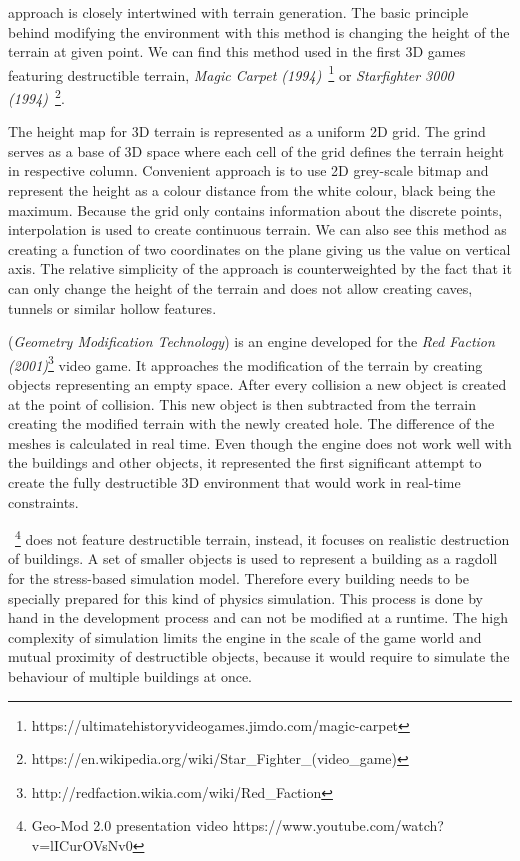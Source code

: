  approach is closely intertwined with terrain generation. The basic principle behind modifying the environment with this method is changing the height of the terrain at given point. We can find this method used in the first 3D games featuring destructible terrain, \eg \emph{Magic Carpet (1994)}~\footnote{https://ultimatehistoryvideogames.jimdo.com/magic-carpet} or \emph{Starfighter 3000 (1994)}~\footnote{https://en.wikipedia.org/wiki/Star\_Fighter\_(video\_game)}.

The height map for 3D terrain is represented as a uniform 2D grid. The grind serves as a base of 3D space where each cell of the grid defines the terrain height in respective column.  Convenient approach is to use 2D grey-scale bitmap and represent the height as a colour distance from the white colour, black being the maximum. Because the grid only contains information about the discrete points, interpolation is used to create continuous terrain. We can also see this method as creating a function of two coordinates on the plane giving us the value on vertical axis. The relative simplicity of the approach is counterweighted by the fact that it can only change the height of the terrain and does not allow creating caves, tunnels or similar hollow features.

 (\emph{Geometry Modification Technology}\cite{geomod}) is an engine developed for the \emph{Red Faction (2001)}\footnote{http://redfaction.wikia.com/wiki/Red\_Faction} video game. It approaches the modification of the terrain by creating objects representing an empty space. After every collision a new object is created at the point of collision. This new object is then subtracted from the terrain creating the modified terrain with the newly created hole. The difference of the meshes is calculated in real time. Even though the engine does not work well with the buildings and other objects, it represented the first significant attempt to create the fully destructible 3D environment that would work in real-time constraints.

~\cite{geomod}\footnote{Geo-Mod 2.0 presentation video https://www.youtube.com/watch?v=lICurOVsNv0} does not feature destructible terrain, instead, it focuses on realistic destruction of buildings. A set of smaller objects is used to represent a building as a ragdoll for the stress-based simulation model. Therefore every building needs to be specially prepared for this kind of physics simulation. This process is done by hand in the development process and can not be modified at a runtime. The high complexity of simulation limits the engine in the scale of the game world and mutual proximity of destructible objects, because it would require to simulate the behaviour of multiple buildings at once.


